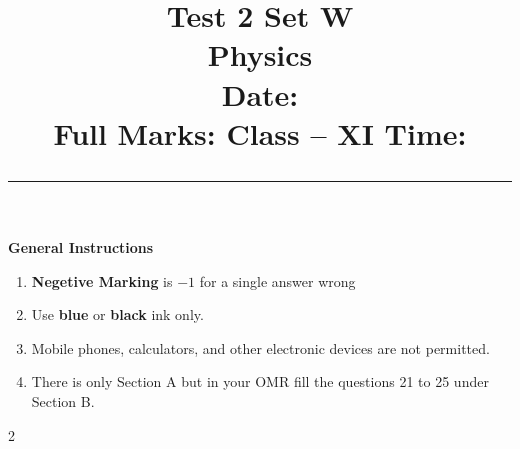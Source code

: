 \documentclass[addpoints,12pt,a4paper]{exam}
\title{%
  \vspace{-1.5cm}%
  {\huge\textbf{Test 2 Set W}}\\[2mm]%
  {\LARGE Physics}\\[2mm]%
  {Date: {\datedate}}\\[3mm]%
  {\large \textbf{Full Marks: \numpoints} \hfill  Class -- XI \hfill \textbf{Time: \examduration}}%
  \vspace{3pt}%
  \hrule\vspace{-2em}%
}
\author{}
\date{}
\begin{document}
\maketitle

\vspace{0.2em}

\begin{center}
	\begin{tcolorbox}
		\begin{center}
			\textbf{\large{General Instructions}}
		\end{center}
		\begin{enumerate}
			\item \textbf{Negetive Marking} is $-1$ for a single answer wrong
			\item Use \textbf{blue} or \textbf{black} ink only.
			\item Mobile phones, calculators, and other electronic devices are not permitted.
			\item There is only Section A but in your OMR fill the questions 21 to 25 under Section B.
		\end{enumerate}
		\vspace{0.2em}
	\end{tcolorbox}
\end{center}

\vspace{0.2em}

\begin{center}
\end{center}

\vspace{1pt}

\begin{multicols}{2}
\end{multicols}

\newpage
{}
\end{document}
